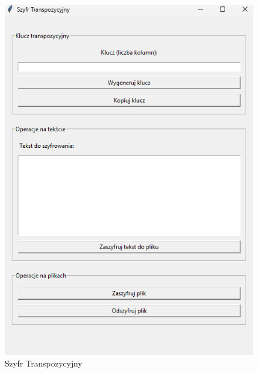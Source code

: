 \documentclass[12pt,a4paper]{article}
\begin{document}
\begin{figure}[!htb]
\begin{center}
\includegraphics[scale=0.45]{pictures/transpozycyjny.png}
\caption{Szyfr Transpozycyjny}
\label{fig:Szyfr Transpozycyjny}
\end{center}
\end{figure}


\newpage
\end{document}
